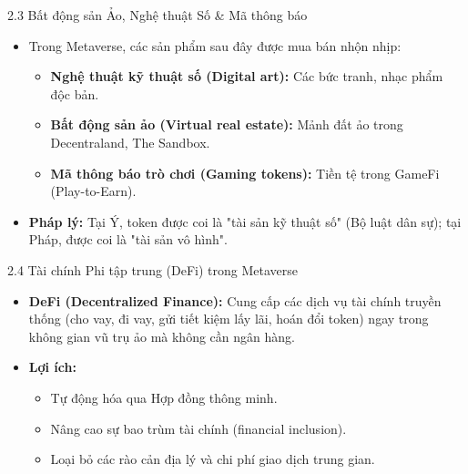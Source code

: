 \documentclass[aspectratio=169]{beamer}
\begin{document}
\begin{frame}{2.3 Bất động sản Ảo, Nghệ thuật Số \& Mã thông báo}
    \begin{itemize}
        \item Trong Metaverse, các sản phẩm sau đây được mua bán nhộn nhịp:
        \begin{itemize}
            \item \textbf{Nghệ thuật kỹ thuật số (Digital art):} Các bức tranh, nhạc phẩm độc bản.
            \item \textbf{Bất động sản ảo (Virtual real estate):} Mảnh đất ảo trong Decentraland, The Sandbox.
            \item \textbf{Mã thông báo trò chơi (Gaming tokens):} Tiền tệ trong GameFi (Play-to-Earn).
        \end{itemize}
        \item \textbf{Pháp lý:} Tại Ý, token được coi là "tài sản kỹ thuật số" (Bộ luật dân sự); tại Pháp, được coi là "tài sản vô hình".
    \end{itemize}
\end{frame}

\begin{frame}{2.4 Tài chính Phi tập trung (DeFi) trong Metaverse}
    \begin{itemize}
        \item \textbf{DeFi (Decentralized Finance):} Cung cấp các dịch vụ tài chính truyền thống (cho vay, đi vay, gửi tiết kiệm lấy lãi, hoán đổi token) ngay trong không gian vũ trụ ảo mà không cần ngân hàng.
        \item \textbf{Lợi ích:}
        \begin{itemize}
            \item Tự động hóa qua Hợp đồng thông minh.
            \item Nâng cao sự bao trùm tài chính (financial inclusion).
            \item Loại bỏ các rào cản địa lý và chi phí giao dịch trung gian.
        \end{itemize}
    \end{itemize}
\end{frame}
\end{document}

